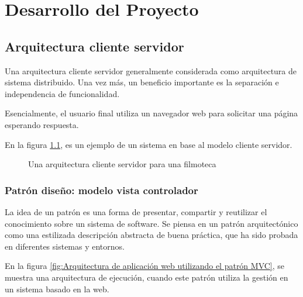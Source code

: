 \chapter{Desarrollo del Proyecto}

\section{Arquitectura cliente servidor}

Una arquitectura cliente servidor generalmente considerada como arquitectura
de sistema distribuido. Una vez más, un beneficio importante es la separación
e independencia de funcionalidad. \cite{sommerville2011software}

Esencialmente, el usuario final utiliza un navegador web para solicitar una
página esperando respuesta.

En la figura \ref{Una arquitectura cliente servidor para una filmoteca}, es un
ejemplo de un sistema en base al modelo cliente servidor. 
\cite{sommerville2011software}

\begin{figure}[!htb]
	\centering
	\caption{Una arquitectura cliente servidor para una filmoteca}
	\label{Una arquitectura cliente servidor para una filmoteca}
\end{figure}

\subsection{Patrón diseño: modelo vista controlador}

La idea de un patrón es una forma de presentar, compartir y reutilizar el
conocimiento sobre un sistema de software. Se piensa en un patrón
arquitectónico como una estilizada descripción abstracta de buena práctica,
que ha sido probada en diferentes sistemas y entornos. \cite{sommerville2011software}

En la figura \ref{fig:Arquitectura de aplicación web utilizando el patrón MVC},
se muestra una arquitectura de ejecución, cuando este patrón utiliza la
gestión en un sistema basado en la web. \cite{sommerville2011software}

\begin{minipage}{1.0\textwidth}
	\centering
	\label{fig:Arquitectura de aplicación web utilizando el patrón MVC}
\end{minipage}

